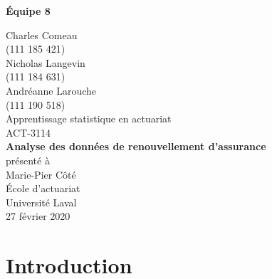 \documentclass[
]{article}
\author{}
\date{\vspace{-2.5em}}
\begin{document}
\newpage
\begin{flushright}
    \textbf{Équipe 8}
\end{flushright}

\begin{center}
    \vspace{2\baselineskip}
    Charles Comeau \\
    (111 185 421) \\
    \vspace{1\baselineskip}
    Nicholas Langevin \\
    (111 184 631) \\
    \vspace{1\baselineskip}
    Andréanne Larouche \\
    (111 190 518) \\
    \vspace{7\baselineskip}
    Apprentissage statistique en actuariat\\
    ACT-3114 \\
    \vspace{7\baselineskip}
    {\large
    \textbf{Analyse des données de renouvellement d'assurance}} \\
    \vspace{8\baselineskip}
    présenté à \\
    Marie-Pier Côté \\
    \vspace{9\baselineskip}
    École d’actuariat \\
    Université Laval \\
    27 février 2020
\end{center}

\newpage

\tableofcontents

\newpage

\hypertarget{introduction}{%
\section{Introduction}\label{introduction}}
\end{document}
